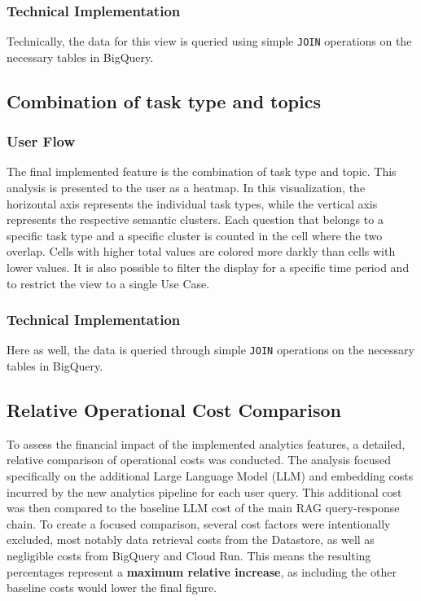 \documentclass[
	english,
	ruledheaders=section,%
	class=report,%
	thesis={type=bachelor},%
	accentcolor=1b,%
	custommargins=true,%
	marginpar=false,%
	parskip=half-,%
	fontsize=11pt,%
	DIV=14,
]{tudapub}
\begin{document}
\subsubsection{Technical Implementation}
Technically, the data for this view is queried using simple \texttt{JOIN} operations on the necessary tables in BigQuery.
\subsection{Combination of task type and topics}
\subsubsection{User Flow}
The final implemented feature is the combination of task type and topic. This analysis is presented to the user as a heatmap. In this visualization, the horizontal axis represents the individual task types, while the vertical axis represents the respective semantic clusters. Each question that belongs to a specific task type and a specific cluster is counted in the cell where the two overlap. Cells with higher total values are colored more darkly than cells with lower values. It is also possible to filter the display for a specific time period and to restrict the view to a single Use Case.

\subsubsection{Technical Implementation}
Here as well, the data is queried through simple \texttt{JOIN} operations on the necessary tables in BigQuery.

\subsection{Relative Operational Cost Comparison}
To assess the financial impact of the implemented analytics features, a detailed, relative comparison of operational costs was conducted. The analysis focused specifically on the additional Large Language Model (LLM) and embedding costs incurred by the new analytics pipeline for each user query. This additional cost was then compared to the baseline LLM cost of the main RAG query-response chain. To create a focused comparison, several cost factors were intentionally excluded, most notably data retrieval costs from the Datastore, as well as negligible costs from BigQuery and Cloud Run. This means the resulting percentages represent a \textbf{maximum relative increase}, as including the other baseline costs would lower the final figure.
\end{document}
